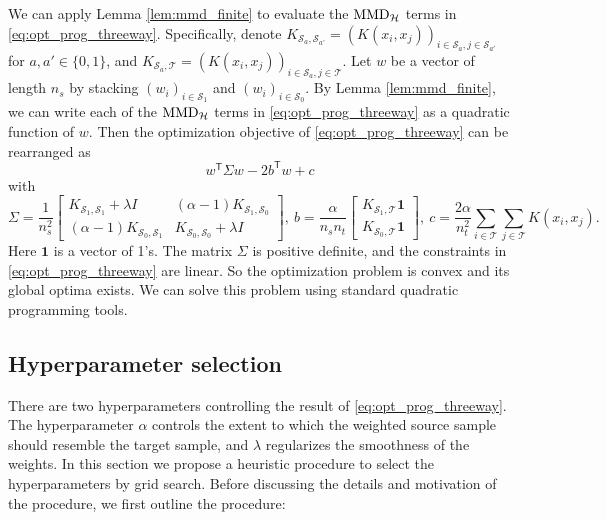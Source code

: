 \documentclass[12pt]{article}
\begin{document}
We can apply Lemma \ref{lem:mmd_finite} to evaluate the $\textnormal{MMD}_\mathcal{H}$ terms in \eqref{eq:opt_prog_threeway}. Specifically, denote $K_{\mathcal{S}_a, \mathcal{S}_{a'}} = \left( K(x_i, x_j) \right)_{i \in \mathcal{S}_a, j \in \mathcal{S}_{a'}}$ for $a, a' \in \{0, 1\}$, and $K_{\mathcal{S}_a, \mathcal{T}} = \left( K(x_i, x_j) \right)_{i \in \mathcal{S}_a, j \in \mathcal{T}}$. Let $w$ be a vector of length $n_s$ by stacking $(w_i)_{i \in \mathcal{S}_1}$ and $(w_i)_{i \in \mathcal{S}_0}$. By Lemma \ref{lem:mmd_finite}, we can write each of the $\textnormal{MMD}_\mathcal{H}$ terms in \eqref{eq:opt_prog_threeway} as a quadratic function of $w$. Then the optimization objective of \eqref{eq:opt_prog_threeway} can be rearranged as
\begin{equation*}
	w^\mathsf{T} \Sigma w - 2 b^\mathsf{T} w + c
\end{equation*}
with
\begin{equation*}
	\Sigma = \frac{1}{n_s^2} \begin{bmatrix}
		K_{\mathcal{S}_1, \mathcal{S}_1} + \lambda I & (\alpha - 1) K_{\mathcal{S}_1, \mathcal{S}_0} \\
		(\alpha - 1) K_{\mathcal{S}_0, \mathcal{S}_1} & K_{\mathcal{S}_0, \mathcal{S}_0} + \lambda I
	\end{bmatrix},
	~
	b = \frac{\alpha}{n_s n_t} \begin{bmatrix}
		K_{\mathcal{S}_1, \mathcal{T}} \mathbf{1} \\
		K_{\mathcal{S}_0, \mathcal{T}} \mathbf{1}
	\end{bmatrix},
	~
	c = \frac{2\alpha}{n_t^2} \sum_{i \in \mathcal{T}} \sum_{j \in \mathcal{T}} K(x_i, x_j) 
	.\end{equation*}
Here $\mathbf{1}$ is a vector of 1's. The matrix $\Sigma$ is positive definite, and the constraints in \eqref{eq:opt_prog_threeway} are linear. So the optimization problem is convex and its global optima exists. We can solve this problem using standard quadratic programming tools. 





\subsection{Hyperparameter selection}
\label{sec:tuning_parameters}

There are two hyperparameters controlling the result of \eqref{eq:opt_prog_threeway}. The hyperparameter $\alpha$ controls the extent to which the weighted source sample should resemble the target sample, and $\lambda$ regularizes the smoothness of the weights. In this section we propose a heuristic procedure to select the hyperparameters by grid search. Before discussing the details and motivation of the procedure, we first outline the procedure:
\end{document}
